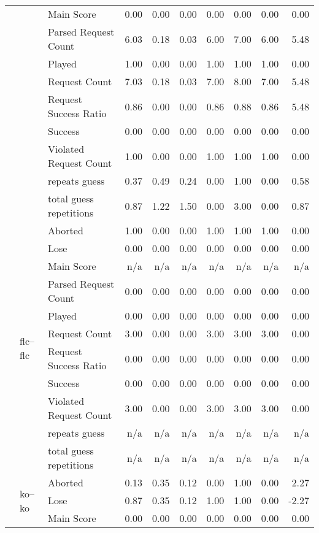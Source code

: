\begin{tabular}{lllrrrrrrr}
 &  & Main Score & 0.00 & 0.00 & 0.00 & 0.00 & 0.00 & 0.00 & 0.00 \\
 &  & Parsed Request Count & 6.03 & 0.18 & 0.03 & 6.00 & 7.00 & 6.00 & 5.48 \\
 &  & Played & 1.00 & 0.00 & 0.00 & 1.00 & 1.00 & 1.00 & 0.00 \\
 &  & Request Count & 7.03 & 0.18 & 0.03 & 7.00 & 8.00 & 7.00 & 5.48 \\
 &  & Request Success Ratio & 0.86 & 0.00 & 0.00 & 0.86 & 0.88 & 0.86 & 5.48 \\
 &  & Success & 0.00 & 0.00 & 0.00 & 0.00 & 0.00 & 0.00 & 0.00 \\
 &  & Violated Request Count & 1.00 & 0.00 & 0.00 & 1.00 & 1.00 & 1.00 & 0.00 \\
 &  & repeats guess & 0.37 & 0.49 & 0.24 & 0.00 & 1.00 & 0.00 & 0.58 \\
 &  & total guess repetitions & 0.87 & 1.22 & 1.50 & 0.00 & 3.00 & 0.00 & 0.87 \\
\cline{2-10}
 & \multirow[t]{11}{*}{flc--flc} & Aborted & 1.00 & 0.00 & 0.00 & 1.00 & 1.00 & 1.00 & 0.00 \\
 &  & Lose & 0.00 & 0.00 & 0.00 & 0.00 & 0.00 & 0.00 & 0.00 \\
 &  & Main Score & n/a & n/a & n/a & n/a & n/a & n/a & n/a \\
 &  & Parsed Request Count & 0.00 & 0.00 & 0.00 & 0.00 & 0.00 & 0.00 & 0.00 \\
 &  & Played & 0.00 & 0.00 & 0.00 & 0.00 & 0.00 & 0.00 & 0.00 \\
 &  & Request Count & 3.00 & 0.00 & 0.00 & 3.00 & 3.00 & 3.00 & 0.00 \\
 &  & Request Success Ratio & 0.00 & 0.00 & 0.00 & 0.00 & 0.00 & 0.00 & 0.00 \\
 &  & Success & 0.00 & 0.00 & 0.00 & 0.00 & 0.00 & 0.00 & 0.00 \\
 &  & Violated Request Count & 3.00 & 0.00 & 0.00 & 3.00 & 3.00 & 3.00 & 0.00 \\
 &  & repeats guess & n/a & n/a & n/a & n/a & n/a & n/a & n/a \\
 &  & total guess repetitions & n/a & n/a & n/a & n/a & n/a & n/a & n/a \\
\cline{2-10}
 & \multirow[t]{11}{*}{ko--ko} & Aborted & 0.13 & 0.35 & 0.12 & 0.00 & 1.00 & 0.00 & 2.27 \\
 &  & Lose & 0.87 & 0.35 & 0.12 & 1.00 & 1.00 & 0.00 & -2.27 \\
 &  & Main Score & 0.00 & 0.00 & 0.00 & 0.00 & 0.00 & 0.00 & 0.00 \\

\end{tabular}
